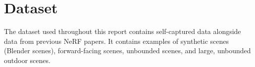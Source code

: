 
\section{Dataset} \label{sec:dataset}
The dataset used throughout this report contains self-captured data alongside data from previous NeRF papers. It contains examples of synthetic scenes (Blender scenes), forward-facing scenes, unbounded scenes, and large, unbounded outdoor scenes.




%


